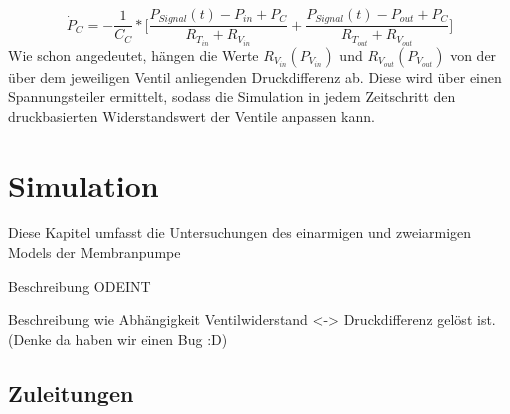 \documentclass[fontsize=12pt, a4paper]{scrartcl}
\let\stdsection\section 	%
\renewcommand\section{\newpage\stdsection}
\begin{document}
\begin{equation}
	\dot{P}_{C} = - \frac{1}{C_{C}} * \biggl[\frac{P_{Signal}(t)-P_{in}+P_{C}}{R_{T_{in}}+R_{V_{in}}} + \frac{P_{Signal}(t)-P_{out}+P_{C}}{R_{T_{out}}+R_{V_{out}}}\biggr]
\end{equation}
Wie schon angedeutet, hängen die Werte $R_{V_{in}}(P_{V_{in}})$ und $R_{V_{out}}(P_{V_{out}})$ von der über dem jeweiligen Ventil anliegenden Druckdifferenz ab. Diese wird über einen Spannungsteiler ermittelt, sodass die Simulation in jedem Zeitschritt den druckbasierten Widerstandswert der Ventile anpassen kann.

\section{Simulation}

Diese Kapitel umfasst die Untersuchungen des einarmigen und zweiarmigen Models der Membranpumpe

Beschreibung ODEINT

Beschreibung wie Abhängigkeit Ventilwiderstand <-> Druckdifferenz gelöst ist. (Denke da haben wir einen Bug :D)

\subsection{Zuleitungen}
\end{document}

